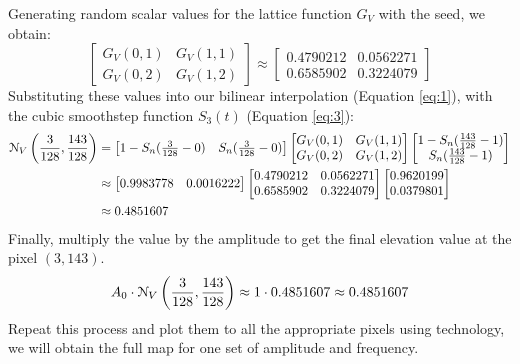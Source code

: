 Generating random scalar values for the lattice function $G_V$ with the seed, we obtain:
\begin{equation*}
    \begin{bmatrix}
        G_V(0,1) & G_V(1,1)\\
        G_V(0,2) & G_V(1,2)
    \end{bmatrix}
    \approx
    \begin{bmatrix}
        0.4790212 & 0.0562271\\
        0.6585902 & 0.3224079
    \end{bmatrix}
\end{equation*}
Substituting these values into our bilinear interpolation (Equation \ref{eq:1}), with the cubic smoothstep function $S_3(t)$ (Equation \ref{eq:3}):
\begin{align*}
    \EuScript{N}_V\left(\frac{3}{128},\frac{143}{128}\right)&=
    \begin{bmatrix}
        1-S_n(\frac{3}{128}-0) & S_n(\frac{3}{128}-0)
    \end{bmatrix}
    \begin{bmatrix}
        G_V(0,1) & G_V(1,1)\\
        G_V(0,2) & G_V(1,2)
    \end{bmatrix}
    \begin{bmatrix}
        1-S_n(\frac{143}{128}-1)\\
        S_n(\frac{143}{128}-1)
    \end{bmatrix}\\
    &\approx
    \begin{bmatrix}
        0.9983778 & 0.0016222
    \end{bmatrix}
    \begin{bmatrix}
        0.4790212 & 0.0562271\\
        0.6585902 & 0.3224079
    \end{bmatrix}
    \begin{bmatrix}
        0.9620199\\
        0.0379801
    \end{bmatrix}\\
    &\approx 0.4851607
\end{align*}
Finally, multiply the value by the amplitude to get the final elevation value at the pixel $(3,143)$.
\[A_0\cdot\EuScript{N}_V\left(\frac{3}{128},\frac{143}{128}\right)\approx1\cdot0.4851607\approx0.4851607\]
Repeat this process and plot them to all the appropriate pixels using technology, we will obtain the full map for one set of amplitude and frequency. 

